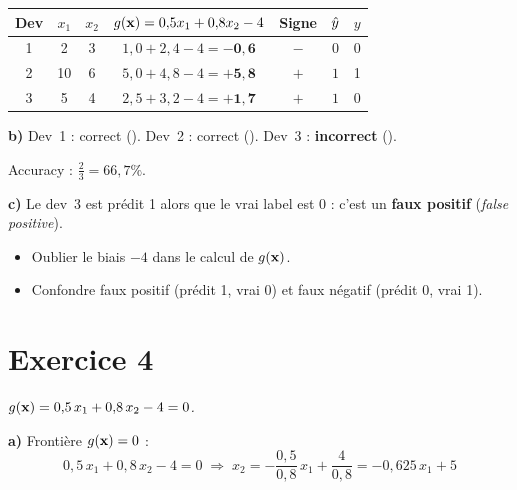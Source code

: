 \begin{center}
\renewcommand{\arraystretch}{1.3}
\begin{tabular}{c|c|c|c|c|c|c}
    \toprule
    Dev & $x_1$ & $x_2$ & $g(\mathbf{x}) = 0{,}5x_1 + 0{,}8x_2 - 4$ & Signe & $\hat{y}$ & $y$ \\
    \midrule
    1 & 2  & 3 & $1{,}0 + 2{,}4 - 4 = \mathbf{-0{,}6}$ & $-$ & $\boxed{0}$ & 0 \\
    2 & 10 & 6 & $5{,}0 + 4{,}8 - 4 = \mathbf{+5{,}8}$ & $+$ & $\boxed{1}$ & 1 \\
    3 & 5  & 4 & $2{,}5 + 3{,}2 - 4 = \mathbf{+1{,}7}$ & $+$ & $\boxed{1}$ & 0 \\
    \bottomrule
\end{tabular}
\end{center}

\textbf{b)} Dev~1 : correct (\checkmark). Dev~2 : correct (\checkmark). Dev~3 : \textbf{incorrect} (\texttimes).

Accuracy : $\frac{2}{3} = \boxed{66{,}7\%}$.

\textbf{c)} Le dev~3 est pr\'{e}dit 1 alors que le vrai label est 0 : c'est un \textbf{faux positif}
(\emph{false positive}).

\begin{attentionbox}
\begin{itemize}
    \item Oublier le biais $-4$ dans le calcul de $g(\mathbf{x})$.
    \item Confondre faux positif (pr\'{e}dit 1, vrai 0) et faux n\'{e}gatif (pr\'{e}dit 0, vrai 1).
\end{itemize}
\end{attentionbox}

\section*{Exercice 4 \hfill \exofondamental}
\textit{$g(\mathbf{x}) = 0{,}5\,x_1 + 0{,}8\,x_2 - 4 = 0$.}

\separateur

\textbf{a)} Fronti\`{e}re $g(\mathbf{x}) = 0$ :
\[
    0{,}5\,x_1 + 0{,}8\,x_2 - 4 = 0
    \;\Longrightarrow\;
    x_2 = -\frac{0{,}5}{0{,}8}\,x_1 + \frac{4}{0{,}8}
    = \boxed{-0{,}625\,x_1 + 5}
\]

